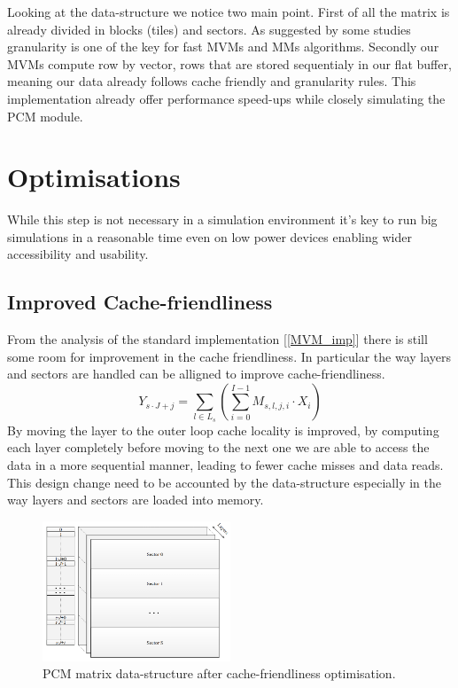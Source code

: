 Looking at the data-structure we notice two main point. 
First of all the matrix is already divided in blocks (tiles) and sectors. 
As suggested by some studies \cite{yajnaseni_survey_2015} granularity is one of the key for fast MVMs and MMs algorithms. 
Secondly our MVMs compute row by vector, 
rows that are stored sequentialy in our flat buffer, meaning our data already follows cache friendly and granularity rules.
This implementation already offer performance speed-ups while closely simulating the PCM module.

\section{Optimisations}\label{sec:optim}
While this step is not necessary in a simulation environment it's key to run big simulations in a reasonable time even on low power devices enabling wider accessibility and usability.

\subsection{Improved Cache-friendliness}\label{sec:cache_friendly}
From the analysis of the standard implementation [\ref{MVM_imp}] there is still some room for improvement in the cache friendliness.
In particular the way layers and sectors are handled can be alligned to improve cache-friendliness.
\begin{equation}
    Y_{s\cdot J + j}=\sum_{l\in L_s}(\sum_{i=0}^{I-1} M_{s,l,j,i}\cdot X_i)
    \label{MVM_op}
\end{equation}
By moving the layer to the outer loop cache locality is improved, by computing each layer completely before moving to the next one we are able to access the data in a more sequential manner, leading to fewer cache misses and data reads.
This design change need to be accounted by the data-structure especially in the way layers and sectors are loaded into memory.
\begin{figure}
    \centering
    \includegraphics[width=0.5\textwidth]{Figures/pcm_cache_friendly.png}
    \caption{PCM matrix data-structure after cache-friendliness optimisation.}
    \label{fig:pcm_cache_friendly}
\end{figure}
